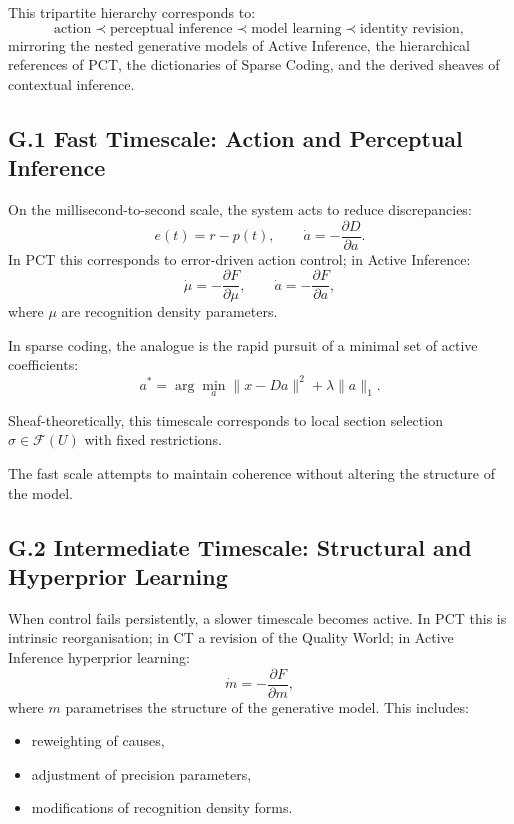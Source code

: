 \documentclass[11pt,a4paper,twoside]{article}
\begin{document}
This tripartite hierarchy corresponds to:
\[
\text{action} \prec \text{perceptual inference} \prec \text{model learning} \prec \text{identity revision},
\]
mirroring the nested generative models of Active Inference, the hierarchical references of PCT, the dictionaries of Sparse Coding, and the derived sheaves of contextual inference.

\subsection*{G.1 Fast Timescale: Action and Perceptual Inference}

On the millisecond-to-second scale, the system acts to reduce discrepancies:
\[
e(t) = r - p(t), \qquad \dot{a} = -\frac{\partial D}{\partial a}.
\]
In PCT this corresponds to error-driven action control; in Active Inference:
\[
\dot{\mu} = -\frac{\partial F}{\partial \mu}, \qquad \dot{a} = -\frac{\partial F}{\partial a},
\]
where $\mu$ are recognition density parameters.

In sparse coding, the analogue is the rapid pursuit of a minimal set of active coefficients:
\[
a^* = \arg\min_a \|x - Da\|^2 + \lambda \|a\|_1.
\]

Sheaf-theoretically, this timescale corresponds to local section selection $\sigma \in \mathscr{F}(U)$ with fixed restrictions.

The fast scale attempts to maintain coherence without altering the structure of the model.

\subsection*{G.2 Intermediate Timescale: Structural and Hyperprior Learning}

When control fails persistently, a slower timescale becomes active. In PCT this is intrinsic reorganisation; in CT a revision of the Quality World; in Active Inference hyperprior learning:
\[
\dot{m} = -\frac{\partial F}{\partial m},
\]
where $m$ parametrises the structure of the generative model. This includes:
\begin{itemize}
    \item reweighting of causes,
    \item adjustment of precision parameters,
    \item modifications of recognition density forms.
\end{itemize}
\end{document}
